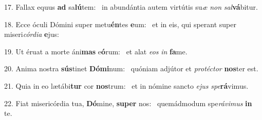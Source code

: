 17. Fallax equus \textbf{ad} sa\textbf{lú}tem: \ast\  in abundántia autem virtútis su\textit{æ} \textit{non} \textit{sal}\textbf{vá}bitur.\

18. Ecce óculi Dómini super metu\textbf{én}tes \textbf{e}um: \ast\  et in eis, qui sperant super miseri\textit{cór}\textit{di}\textit{a} \textbf{e}jus:\

19. Ut éruat a morte áni\textbf{mas} e\textbf{ó}rum: \ast\  et alat \textit{e}\textit{os} \textit{in} \textbf{fa}me.\

20. Anima nostra \textbf{sús}tinet \textbf{Dó}\textbf{mi}num: \ast\  quóniam adjútor et \textit{pro}\textit{téc}\textit{tor} \textbf{nos}ter est.\

21. Quia in eo lætábi\textbf{tur} cor \textbf{nos}trum: \ast\  et in nómine sancto \textit{e}\textit{jus} \textit{spe}\textbf{rá}vimus.\

22. Fiat misericórdia tua, \textbf{Dó}mine, \textbf{su}\textbf{per} nos: \ast\  quemádmodum spe\textit{rá}\textit{vi}\textit{mus} \textbf{in} te.\

